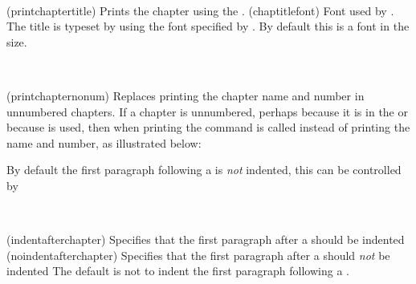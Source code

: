 \begin{syntax}
\cmd{\printchaptertitle} \cmd{\chaptitlefont} \\
\end{syntax}
\glossary(printchaptertitle)%
  {}%
  {Prints the chapter  using the .}
\glossary(chaptitlefont)%
  {}%
  {Font used by .}
The title is typeset by \cmd{\printchaptertitle} using the font specified
by \cmd{\chaptitlefont}.
By default this is a \cmd{\bfseries} font in the \cmd{\Huge} size.

\begin{syntax}
\cmd{\printchapternonum} \\
\end{syntax}
\glossary(printchapternonum)%
  {}%
  {Replaces printing the chapter name and number in unnumbered chapters.}
If a chapter is unnumbered, perhaps because it is in the \cmd{\frontmatter}
or because \cmd{\chapter*} is used, then when printing the command
\cmd{\printchapternonum} is called instead of printing the name and number,
as illustrated below:
\begin{lcode}
\newcommand{\chapterhead}[1]{ %
  \clearforchapter        %
  \thispagestyle{chapter} %
  \insertchapterspace     %
  \chapterheadstart       %
  \printchaptername\chapternamenum\printchapternum
  \afterchapternum        %
  \printchaptertitle{#1}  %
  \afterchaptertitle}     %
\end{lcode}
%
%
%
By default the first paragraph following a  is \emph{not}
indented, this can be controlled by
\begin{syntax}
  \cmd{\indentafterchapter}\\
  \cmd{\noindentafterchapter}
\end{syntax}
\glossary(indentafterchapter)%
{}%
{Specifies that the first paragraph after a  should be indented}
\glossary(noindentafterchapter)%
{}%
{Specifies that the first paragraph after a  should \emph{not} be indented}
The default is not to indent the first paragraph following a
.

